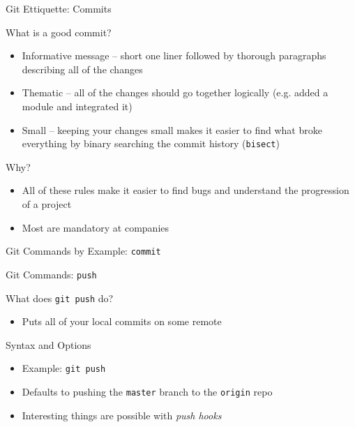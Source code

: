 \documentclass[table,dvipsnames]{beamer}
\begin{document}
\begin{frame}{Git Ettiquette: Commits}
	\begin{block}{What is a good commit?}
		\begin{itemize}
			\item Informative message -- short one liner followed by thorough 
				paragraphs describing all of the changes
			\item Thematic -- all of the changes should go together logically 
				(e.g. added a module and integrated it)
			\item Small -- keeping your changes small makes it easier to find 
				what broke everything by binary searching the commit history 
				(\texttt{bisect})
		\end{itemize}
	\end{block}
	\begin{block}{Why?}
		\begin{itemize}
			\item All of these rules make it easier to find bugs and understand 
				the progression of a project
			\item Most are mandatory at companies
		\end{itemize}
	\end{block}
\end{frame}


\begin{frame}{Git Commands by Example: \texttt{commit}}
\end{frame}

\begin{frame}{Git Commands: \texttt{push}}
	\begin{block}{What does \texttt{git push} do?}
		\begin{itemize}
			\item Puts all of your local commits on some remote
		\end{itemize}
	\end{block}
	\begin{block}{Syntax and Options}
		\begin{itemize}
			\item Example: \texttt{git push}
			\item Defaults to pushing the \texttt{master} branch to the 
				\texttt{origin} repo
			\item Interesting things are possible with \emph{push hooks}
		\end{itemize}
	\end{block}
\end{frame}
\end{document}
